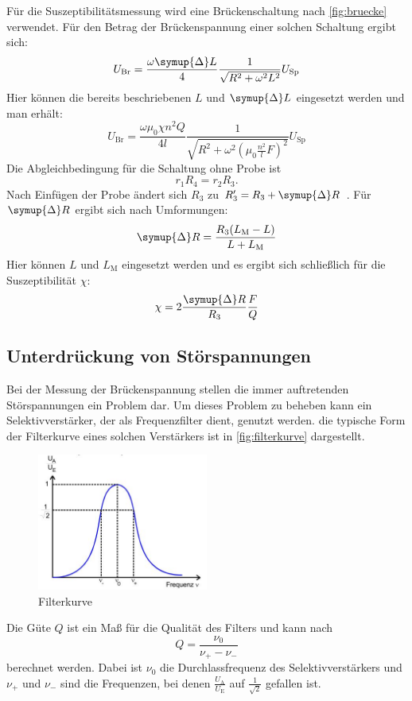 Für die Suszeptibilitätsmessung wird eine Brückenschaltung nach \autoref{fig:bruecke} verwendet. Für den Betrag der Brückenspannung einer solchen Schaltung ergibt sich:
\begin{equation}
U_\text{Br} = \frac{\omega \symup{\Delta} L}{4} \frac{1}{\sqrt{R^2 + {\omega}^2 L^2 }} U_\text{Sp}
\end{equation}
Hier können die bereits beschriebenen $L$  und $\symup{\Delta} L$ eingesetzt werden und man erhält:
\begin{equation}
U_\text{Br} = \frac{\omega \mu_0 \chi n^2 Q}{4l} \frac{1}{\sqrt{R^2 + {\omega}^2(\mu_0 \frac{n^2}{l}F)^2}} U_\text{Sp}
\end{equation}
Die Abgleichbedingung für die Schaltung ohne Probe ist
\begin{equation}
    r_1 R_4 = r_2 R_3 .
\end{equation}
Nach Einfügen der Probe ändert sich $R_3$ zu $R'_3 = R_3 + \symup{\Delta}R$ .
Für $\symup{\Delta}R$ ergibt sich nach Umformungen:
\begin{equation}
    \symup{\Delta}R = \frac{R_3 (L_\text{M} - L)}{L + L_\text{M}} 
\end{equation}
Hier können $L$ und $L_\text{M}$ eingesetzt werden und es ergibt sich schließlich für die Suszeptibilität $\chi$:
\begin{equation}
    \label{eqn:chi}
    \chi = 2 \frac{\symup{\Delta}R}{R_3} \frac{F}{Q}
\end{equation}

\subsection{Unterdrückung von Störspannungen}
Bei der Messung der Brückenspannung stellen die immer auftretenden Störspannungen ein Problem dar. Um dieses Problem zu beheben kann ein Selektivverstärker, der als Frequenzfilter dient, genutzt werden. die typische Form der Filterkurve eines solchen Verstärkers ist in \autoref{fig:filterkurve} dargestellt.
\begin{figure}[H]
    \centering
    \includegraphics[width=0.5\textwidth]{content/filterkurve.jpg}
    \caption{Filterkurve \cite{versuchsanleitung}}
    \label{fig:filterkurve}
  \end{figure}
Die Güte $Q$ ist ein Maß für die Qualität des Filters und kann nach 
  \begin{equation}
    \label{eqn:güte}
    Q = \frac{\nu_0}{\nu_+ - \nu_-}
\end{equation}
berechnet werden. Dabei ist $\nu_0$ die Durchlassfrequenz des Selektivverstärkers und $\nu_+$ und $\nu_-$ sind die Frequenzen,
bei denen $\frac{U_\text{A}}{U_\text{E}}$ auf $\frac{1}{\sqrt{2}}$ gefallen ist.